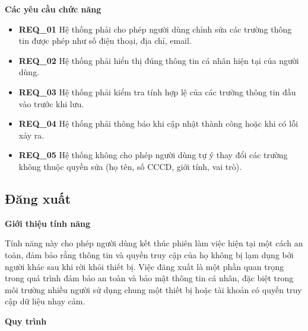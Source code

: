 \noindent \textbf{Các yêu cầu chức năng}

\begin{itemize}

  \item \textbf{REQ\_01} Hệ thống phải cho phép người dùng chỉnh sửa các trường thông tin được phép như số điện thoại, địa chỉ, email.

  \item \textbf{REQ\_02} Hệ thống phải hiển thị đúng thông tin cá nhân hiện tại của người dùng.

  \item \textbf{REQ\_03} Hệ thống phải kiểm tra tính hợp lệ của các trường thông tin đầu vào trước khi lưu.

  \item \textbf{REQ\_04} Hệ thống phải thông báo khi cập nhật thành công hoặc khi có lỗi xảy ra.

  \item \textbf{REQ\_05} Hệ thống không cho phép người dùng tự ý thay đổi các trường không thuộc quyền sửa (họ tên, số CCCD, giới tính, vai trò).

\end{itemize}

\subsection{Đăng xuất}

\noindent \textbf{Giới thiệu tính năng}

Tính năng này cho phép người dùng kết thúc phiên làm việc hiện tại một cách an toàn, đảm bảo rằng thông tin và quyền truy cập của họ không bị lạm dụng bởi người khác sau khi rời khỏi thiết bị. Việc đăng xuất là một phần quan trọng trong quá trình đảm bảo an toàn và bảo mật thông tin cá nhân, đặc biệt trong môi trường nhiều người sử dụng chung một thiết bị hoặc tài khoản có quyền truy cập dữ liệu nhạy cảm.

\noindent \textbf{Quy trình}

